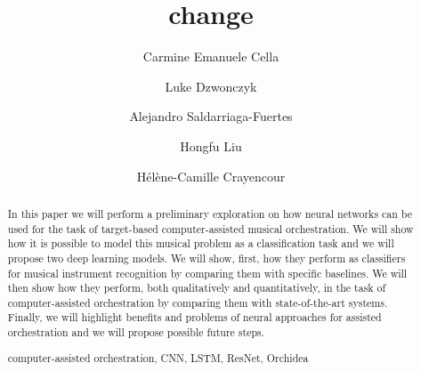 \documentclass[runningheads,a4paper]{llncs}
\newcommand{\keywords}[1]{\par\addvspace\baselineskip
\noindent\keywordname\enspace\ignorespaces#1}
\begin{document}
\mainmatter  %

\title{change}


%
%
\author{Carmine Emanuele Cella\and Luke Dzwonczyk\and Alejandro Saldarriaga-Fuertes\and Hongfu Liu\and H\'el\`ene-Camille Crayencour}
%



%
%

\maketitle

\begin{abstract}
In this paper we will perform a preliminary exploration on how neural networks can be used for the task of target-based computer-assisted musical orchestration. We will show how it is possible to model this  musical problem as a classification task and we will propose two deep learning models. We will show, first, how they perform as classifiers for musical instrument recognition by comparing them with specific baselines. We will then show how they perform, both qualitatively and quantitatively, in the task of computer-assisted orchestration by comparing them with state-of-the-art systems. Finally, we will highlight benefits and problems of neural approaches for assisted orchestration and we will propose possible future steps.

\keywords{computer-assisted orchestration, CNN, LSTM, ResNet, Orchidea}

\end{abstract}
\end{document}
